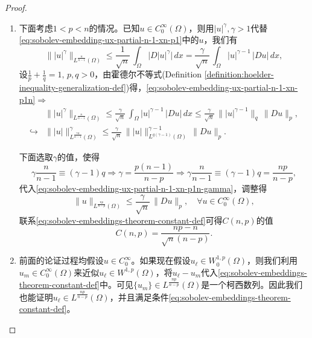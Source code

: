 \begin{proof}
\begin{enumerate}
\item 下面考虑$1<p<n$的情况。已知$u \in C_0^{\infty}(\Omega)$，则用$\left| u \right|^{\gamma}, \gamma >1$代替\eqref{eq:sobolev-embedding-ux-partial-n-1-xn-p1}中的$u$，我们有
\begin{equation}
\label{eq:sobolev-embedding-ux-partial-n-1-xn-p1n}
  \big\| \left| u \right|^{\gamma} \big\|_{L^{\frac{n}{n-1}}(\Omega)}  \le \frac{1}{\sqrt{n}} \, \int_{\Omega} \big| D \left| u \right|^{\gamma} \big| \, dx = \frac{\gamma}{\sqrt{n}} \, \int_{\Omega} \big| u \big| ^{\gamma -1} \, \big| D u \big| \, dx,
\end{equation}
设$\frac{1}{p}+\frac{1}{q}=1, \, p,q > 0$，由霍德尔不等式(Definition \ref{definition:hoelder-inequality-generalization-def})得，\eqref{eq:sobolev-embedding-ux-partial-n-1-xn-p1n}$ \Rightarrow$
\begin{equation}
  \label{eq:sobolev-embedding-ux-partial-n-1-xn-p1n-gamma}
  \begin{split}
    &\big\| \left| u \right|^{\gamma} \big\|_{L^{\frac{n}{n-1}}(\Omega)}
    \le \frac{\gamma}{\sqrt{n}} \, \int_{\Omega} \big| u \big| ^{\gamma -1} \, \big| D u \big| \, dx
    \le \frac{\gamma}{\sqrt{n}} \,
    \Big\| \left| u \right|^{\gamma -1} \Big\|_{q} \,
    \Big\| D u \Big\|_{p}, \\
    \hookrightarrow &
    \big\| \left| u \right| \big\|_{L^{\frac{\gamma n}{n-1}}(\Omega)}^{\gamma}
    \le \frac{\gamma}{\sqrt{n}} \,
    \Big\| \left| u \right| \Big\|_{L^{q (\gamma - 1)}(\Omega)}^{\gamma -1} \,
    \Big\| D u \Big\|_{p}.
  \end{split}
\end{equation}

下面选取$\gamma$的值，使得
\begin{equation*}
  \gamma \frac{n}{n-1} \equiv (\gamma - 1) q \Longrightarrow \gamma = \frac{p(n-1)}{n-p} \Longrightarrow \gamma \frac{n}{n-1} \equiv (\gamma - 1) q = \frac{np}{n-p},
\end{equation*}
代入\eqref{eq:sobolev-embedding-ux-partial-n-1-xn-p1n-gamma}，调整得
\begin{equation*}
  \big\| u \big\|_{L^{\frac{np}{n-p}}(\Omega)} \le \frac{\gamma}{\sqrt{n}} \, \big\| D u \|_{p}, \quad \forall u \in C_0^{\infty}(\Omega),
\end{equation*}
联系\eqref{eq:sobolev-embeddings-theorem-constant-def}可得$C(n,p)$的值
\begin{equation*}
  C(n,p)=\frac{np-n}{\sqrt{n} (n-p)}.
\end{equation*}

\item 前面的论证过程均假设$u \in C_0^{\infty}$。如果现在假设$u_{\ell} \in W^{1,p}_{0}(\Omega)$，则我们利用$u_m \in C_0^{\infty}(\Omega)$来近似$u_{\ell} \in W^{1,p}(\Omega)$，将$u_{\ell}-u_m$代入\eqref{eq:sobolev-embeddings-theorem-constant-def}中。可见$\{ u_m \} \in L^{\frac{np}{n-p}}(\Omega)$是一个柯西数列。因此我们也能证明$u_{\ell} \in L^{\frac{np}{n-p}}(\Omega)$，并且满足条件\eqref{eq:sobolev-embeddings-theorem-constant-def}。
\end{enumerate}
\end{proof}

